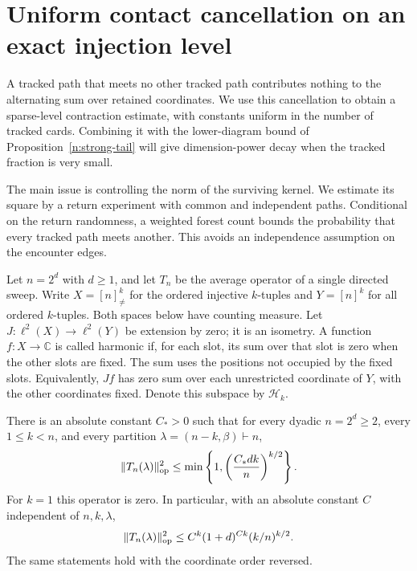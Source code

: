 \section{Uniform contact cancellation on an exact injection level}
\label{n:coherent-contact-section}

A tracked path that meets no other tracked path contributes nothing
to the alternating sum over retained coordinates.  We use this
cancellation to obtain a sparse-level contraction estimate, with
constants uniform in the number of tracked cards.  Combining it
with the lower-diagram bound of Proposition~\ref{n:strong-tail}
will give dimension-power decay when the tracked fraction is very
small.

The main issue is controlling the norm of the surviving kernel.
We estimate its square by a return experiment with common and
independent paths.  Conditional on the return randomness, a
weighted forest count bounds the probability that every tracked
path meets another.  This avoids an independence assumption on
the encounter edges.

Let $n=2^d$ with $d\ge1$, and let $T_n$ be the average operator of a
single directed sweep.  Write $X=[n]_{\ne}^k$ for the ordered injective
$k$-tuples and $Y=[n]^k$ for all ordered $k$-tuples.  Both spaces below
have counting measure.  Let
$J:\ell^2(X)\longrightarrow\ell^2(Y)$ be extension by zero; it is an
isometry.  A function $f:X\to\mathbb C$ is called harmonic if, for each
slot, its sum over that slot is zero when the other slots are fixed.
The sum uses the positions not occupied by the fixed slots.  Equivalently,
$Jf$ has zero sum over each unrestricted coordinate of $Y$, with the
other coordinates fixed.  Denote this subspace by $\mathcal H_k$.

\begin{proposition}
\label{n:coherent-contact}
There is an absolute constant $C_*>0$ such that for every dyadic
$n=2^d\ge2$, every $1\le k<n$, and every partition
$\lambda=(n-k,\beta)\vdash n$,
\begin{equation}\label{n:coherent-contact-sharp}
 \|T_n(\lambda)\|_{\mathrm{op}}^2
 \le \min\left\{1,\left(\frac{C_*dk}{n}\right)^{k/2}\right\}.
\end{equation}
For $k=1$ this operator is zero.  In particular, with an absolute
constant $C$ independent of $n,k,\lambda$,
\begin{equation}\label{rec:coherent-contact-bound}
 \|T_n(\lambda)\|_{\mathrm{op}}^2
 \le C^k(1+d)^{Ck}(k/n)^{k/2}.
\end{equation}
The same statements hold with the coordinate order reversed.
\end{proposition}

